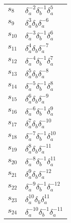 \documentclass{article}
\begin{document}
\begin{center}
\begin{tabular}{ll}
$s_{8}$ & $\delta_a^{-2}\delta_b^{-1}\delta_a^{5}$ \\
$s_{9}$ & $\delta_a^{3}\delta_b^{}\delta_a^{-6}$ \\
$s_{10}$ & $\delta_a^{-3}\delta_b^{-1}\delta_a^{6}$ \\
$s_{11}$ & $\delta_a^{4}\delta_b^{}\delta_a^{-7}$ \\
$s_{12}$ & $\delta_a^{-4}\delta_b^{-1}\delta_a^{7}$ \\
$s_{13}$ & $\delta_a^{5}\delta_b^{}\delta_a^{-8}$ \\
$s_{14}$ & $\delta_a^{-5}\delta_b^{-1}\delta_a^{8}$ \\
$s_{15}$ & $\delta_a^{6}\delta_b^{}\delta_a^{-9}$ \\
$s_{16}$ & $\delta_a^{-6}\delta_b^{-1}\delta_a^{9}$ \\
$s_{17}$ & $\delta_a^{7}\delta_b^{}\delta_a^{-10}$ \\
$s_{18}$ & $\delta_a^{-7}\delta_b^{-1}\delta_a^{10}$ \\
$s_{19}$ & $\delta_a^{8}\delta_b^{}\delta_a^{-11}$ \\
$s_{20}$ & $\delta_a^{-8}\delta_b^{-1}\delta_a^{11}$ \\
$s_{21}$ & $\delta_a^{9}\delta_b^{}\delta_a^{-12}$ \\
$s_{22}$ & $\delta_a^{-9}\delta_b^{-1}\delta_a^{-12}$ \\
$s_{23}$ & $\delta_a^{10}\delta_b^{}\delta_a^{11}$ \\
$s_{24}$ & $\delta_a^{-10}\delta_b^{-1}\delta_a^{-11}$ \\
\bottomrule
\end{tabular}
\end{center}

\thispagestyle{empty}
\end{document}
